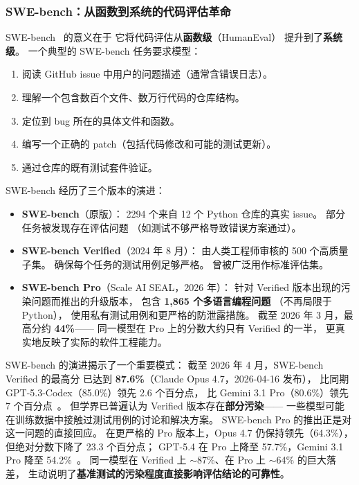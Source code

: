 \subsubsection{SWE-bench：从函数到系统的代码评估革命}

SWE-bench~\cite{jimenez2024swebench} 的意义在于
它将代码评估从\textbf{函数级}（HumanEval）
提升到了\textbf{系统级}。
一个典型的 SWE-bench 任务要求模型：
\begin{enumerate}[noitemsep]
  \item 阅读 GitHub issue 中用户的问题描述（通常含错误日志）。
  \item 理解一个包含数百个文件、数万行代码的仓库结构。
  \item 定位到 bug 所在的具体文件和函数。
  \item 编写一个正确的 patch（包括代码修改和可能的测试更新）。
  \item 通过仓库的既有测试套件验证。
\end{enumerate}

SWE-bench 经历了三个版本的演进：
\begin{itemize}[noitemsep]
  \item \textbf{SWE-bench}（原版）：
        2294 个来自 12 个 Python 仓库的真实 issue。
        部分任务被发现存在评估问题
        （如测试不够严格导致错误方案通过）。
  \item \textbf{SWE-bench Verified}（2024 年 8 月）：
        由人类工程师审核的 500 个高质量子集。
        确保每个任务的测试用例足够严格。
        曾被广泛用作标准评估集。
  \item \textbf{SWE-bench Pro}（Scale AI SEAL，2026 年）：
        针对 Verified 版本出现的污染问题而推出的升级版本，
        包含 \textbf{1,865 个多语言编程问题}
        （不再局限于 Python），
        使用私有测试用例和更严格的防泄露措施。
        截至 2026 年 3 月，最高分约 \textbf{44\%}——
        同一模型在 Pro 上的分数大约只有 Verified 的一半，
        更真实地反映了实际的软件工程能力。
\end{itemize}

SWE-bench 的演进揭示了一个重要模式：
截至 2026 年 4 月，SWE-bench Verified 的最高分
已达到 \textbf{87.6\%}（Claude Opus 4.7，2026-04-16 发布），
比同期 GPT-5.3-Codex（85.0\%）领先 2.6 个百分点，
比 Gemini 3.1 Pro（80.6\%）领先 7 个百分点~\cite{tokenmix2026swebench}。
但学界已普遍认为 Verified 版本存在\textbf{部分污染}——
一些模型可能在训练数据中接触过测试用例的讨论和解决方案。
SWE-bench Pro 的推出正是对这一问题的直接回应。
在更严格的 Pro 版本上，Opus 4.7 仍保持领先（64.3\%），
但绝对分数下降了 23.3 个百分点；
GPT-5.4 在 Pro 上降至 57.7\%，Gemini 3.1 Pro 降至 54.2\%~\cite{buildfast2026opus47}。
同一模型在 Verified 上 $\sim$87\%、在 Pro 上 $\sim$64\% 的巨大落差，
生动说明了\textbf{基准测试的污染程度直接影响评估结论的可靠性}。

